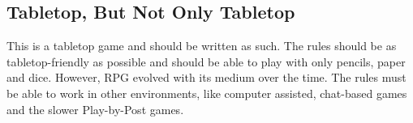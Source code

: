 \begin{multicols}{2}
\subsection{Tabletop, But Not Only Tabletop}\label{subsec:tabletop}
This is a tabletop game and should be written as such. The rules should be as tabletop-friendly as possible and should be able to play with only pencils, paper and dice. However, RPG evolved with its medium over the time. The rules must be able to work in other environments, like computer assisted, chat-based games and the slower Play-by-Post games.

\end{multicols}
\vfill
\begin{center}
\end{center}